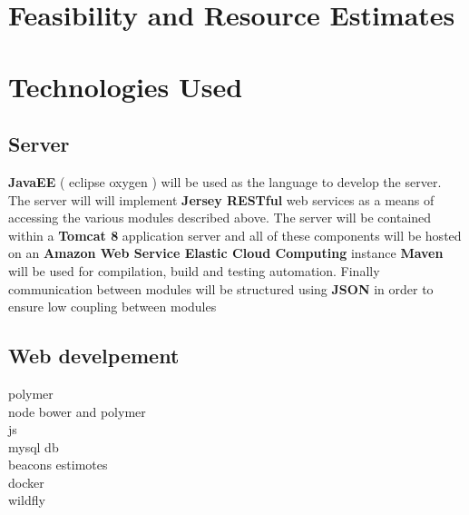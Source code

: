 \documentclass[11pt]{article}
\begin{document}
\section{Feasibility and Resource Estimates}

\section{Technologies Used}
\subsection{Server}
\textbf{JavaEE} ( eclipse oxygen ) will be used as the language to develop the server. The server will will implement \textbf{Jersey RESTful} web services as a means of accessing the various modules described above.
\newline
The server will be contained within a \textbf{Tomcat 8} application server and all of these components will be hosted on an \textbf{Amazon Web Service Elastic Cloud Computing} instance
\newline
\textbf{Maven} will be used for compilation, build and testing automation. Finally communication between modules will be structured using \textbf{JSON} in order to ensure low coupling between modules 
\subsection{Web develpement}
polymer\\
node bower and polymer\\
js\\
mysql db\\
beacons estimotes\\
docker\\
wildfly\\
\end{document}
